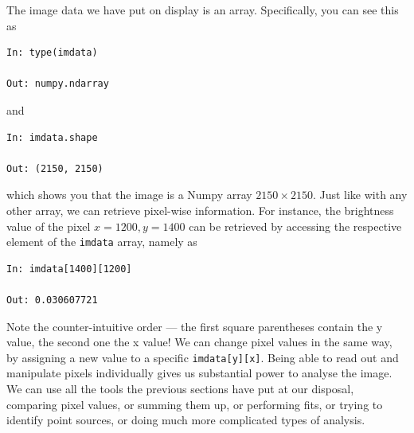 \documentclass[twocolumn,apj]{openjournal}
\begin{document}
The image data we have put on display is an array. Specifically, you can see this as 
\begin{lstlisting}
In: type(imdata)

Out: numpy.ndarray
\end{lstlisting}
and 
\begin{lstlisting}
In: imdata.shape

Out: (2150, 2150)
\end{lstlisting}
which shows you that the image is a Numpy array $2150\times 2150$. Just like with any other array, we can retrieve pixel-wise information. For instance, the brightness value of the pixel $x=1200, y=1400$ can be retrieved by accessing the respective element of the \verb|imdata| array, namely as
\begin{lstlisting}
In: imdata[1400][1200]

Out: 0.030607721
\end{lstlisting}
Note the counter-intuitive order --- the first square parentheses contain the y value, the second one the x value! We can change pixel values in the same way, by assigning a new value to a specific \verb|imdata[y][x]|.
Being able to read out and manipulate pixels individually gives us substantial power to analyse the image. We can use all the tools the previous sections have put at our disposal, comparing pixel values, or summing them up, or performing fits, or trying to identify point sources, or doing much more complicated types of analysis.
\end{document}
